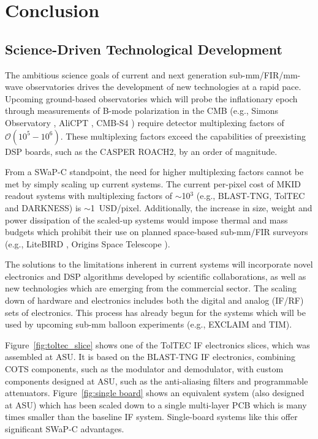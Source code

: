 \chapter{Conclusion}\label{conclusion}

\section{Science-Driven Technological Development}

The ambitious science goals of current and next generation sub-mm/FIR/mm-wave observatories drives the development of new technologies at a rapid pace. Upcoming ground-based observatories which will probe the inflationary epoch through measurements of B-mode polarization in the CMB (e.g., Simons Observatory \citep{ade2019simons}, AliCPT \citep{li2018probing}, CMB-S4 \citep{abitbol2017cmb}) require detector multiplexing factors of $\mathcal{O}(10^{5}-10^{6})$. These multiplexing factors exceed the capabilities of preexisting DSP boards, such as the CASPER ROACH2, by an order of magnitude.

From a SWaP-C standpoint, the need for higher multiplexing factors cannot be met by simply scaling up current systems. The current per-pixel cost of MKID readout systems with multiplexing factors of $\sim$10$^{3}$ (e.g., BLAST-TNG, TolTEC and DARKNESS) is $\sim$1~USD/pixel. Additionally, the increase in size, weight and power dissipation of the scaled-up systems would impose thermal and mass budgets which prohibit their use on planned space-based sub-mm/FIR surveyors (e.g., LiteBIRD \citep{matsumura2014mission}, Origins Space Telescope \citep{battersby2018origins}).

The solutions to the limitations inherent in current systems will incorporate novel electronics and DSP algorithms developed by scientific collaborations, as well as new technologies which are emerging from the commercial sector. The scaling down of hardware and electronics includes both the digital and analog (IF/RF) sets of electronics. This process has already begun for the systems which will be used by upcoming sub-mm balloon experiments (e.g., EXCLAIM and TIM).

Figure~\ref{fig:toltec_slice} shows one of the TolTEC IF electronics slices, which was assembled at ASU\@. It is based on the BLAST-TNG IF electronics, combining COTS components, such as the modulator and demodulator, with custom components designed at ASU, such as the anti-aliasing filters and programmable attenuators. Figure~\ref{fig:single board} shows an equivalent system (also designed at ASU) which has been scaled down to a single multi-layer PCB which is many times smaller than the baseline IF system. Single-board systems like this offer significant SWaP-C advantages.

